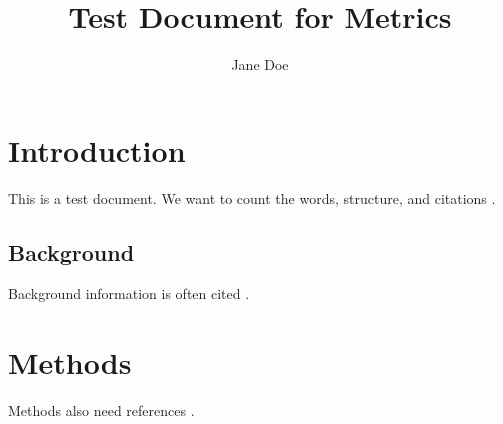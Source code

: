 \documentclass[12pt]{article}
\title{Test Document for Metrics}
\author{Jane Doe}
\begin{document}
\maketitle

\section{Introduction}
This is a test document. We want to count the words, structure, and citations \cite{smith2020,doe2019}.

\subsection{Background}
Background information is often cited \cite{doe2019}.

\section{Methods}
Methods also need references \cite{johnson2021}.



\end{document}

